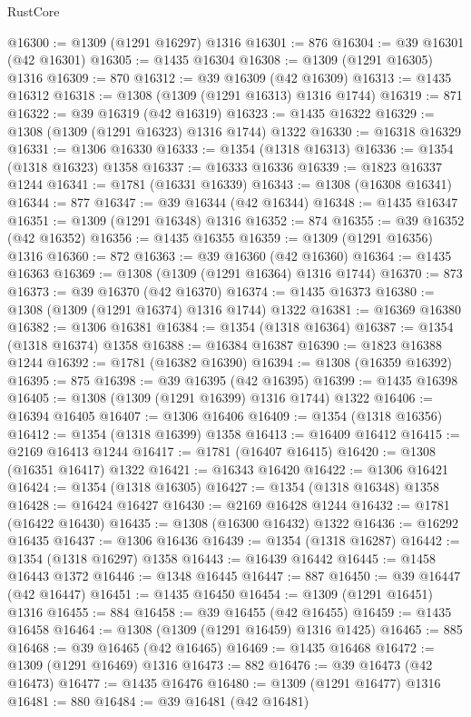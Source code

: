 \begin{lexlean}{RustCore}
\begin{coremodule}
@16300 := @1309 (@1291 @16297) @1316
@16301 := 876
@16304 := @39 @16301 (@42 @16301)
@16305 := @1435 @16304
@16308 := @1309 (@1291 @16305) @1316
@16309 := 870
@16312 := @39 @16309 (@42 @16309)
@16313 := @1435 @16312
@16318 := @1308 (@1309 (@1291 @16313) @1316 @1744)
@16319 := 871
@16322 := @39 @16319 (@42 @16319)
@16323 := @1435 @16322
@16329 := @1308 (@1309 (@1291 @16323) @1316 @1744) @1322
@16330 := @16318 @16329
@16331 := @1306 @16330
@16333 := @1354 (@1318 @16313)
@16336 := @1354 (@1318 @16323) @1358
@16337 := @16333 @16336
@16339 := @1823 @16337 @1244
@16341 := @1781 (@16331 @16339)
@16343 := @1308 (@16308 @16341)
@16344 := 877
@16347 := @39 @16344 (@42 @16344)
@16348 := @1435 @16347
@16351 := @1309 (@1291 @16348) @1316
@16352 := 874
@16355 := @39 @16352 (@42 @16352)
@16356 := @1435 @16355
@16359 := @1309 (@1291 @16356) @1316
@16360 := 872
@16363 := @39 @16360 (@42 @16360)
@16364 := @1435 @16363
@16369 := @1308 (@1309 (@1291 @16364) @1316 @1744)
@16370 := 873
@16373 := @39 @16370 (@42 @16370)
@16374 := @1435 @16373
@16380 := @1308 (@1309 (@1291 @16374) @1316 @1744) @1322
@16381 := @16369 @16380
@16382 := @1306 @16381
@16384 := @1354 (@1318 @16364)
@16387 := @1354 (@1318 @16374) @1358
@16388 := @16384 @16387
@16390 := @1823 @16388 @1244
@16392 := @1781 (@16382 @16390)
@16394 := @1308 (@16359 @16392)
@16395 := 875
@16398 := @39 @16395 (@42 @16395)
@16399 := @1435 @16398
@16405 := @1308 (@1309 (@1291 @16399) @1316 @1744) @1322
@16406 := @16394 @16405
@16407 := @1306 @16406
@16409 := @1354 (@1318 @16356)
@16412 := @1354 (@1318 @16399) @1358
@16413 := @16409 @16412
@16415 := @2169 @16413 @1244
@16417 := @1781 (@16407 @16415)
@16420 := @1308 (@16351 @16417) @1322
@16421 := @16343 @16420
@16422 := @1306 @16421
@16424 := @1354 (@1318 @16305)
@16427 := @1354 (@1318 @16348) @1358
@16428 := @16424 @16427
@16430 := @2169 @16428 @1244
@16432 := @1781 (@16422 @16430)
@16435 := @1308 (@16300 @16432) @1322
@16436 := @16292 @16435
@16437 := @1306 @16436
@16439 := @1354 (@1318 @16287)
@16442 := @1354 (@1318 @16297) @1358
@16443 := @16439 @16442
@16445 := @1458 @16443 @1372
@16446 := @1348 @16445
@16447 := 887
@16450 := @39 @16447 (@42 @16447)
@16451 := @1435 @16450
@16454 := @1309 (@1291 @16451) @1316
@16455 := 884
@16458 := @39 @16455 (@42 @16455)
@16459 := @1435 @16458
@16464 := @1308 (@1309 (@1291 @16459) @1316 @1425)
@16465 := 885
@16468 := @39 @16465 (@42 @16465)
@16469 := @1435 @16468
@16472 := @1309 (@1291 @16469) @1316
@16473 := 882
@16476 := @39 @16473 (@42 @16473)
@16477 := @1435 @16476
@16480 := @1309 (@1291 @16477) @1316
@16481 := 880
@16484 := @39 @16481 (@42 @16481)

\end{coremodule}
\end{lexlean}
